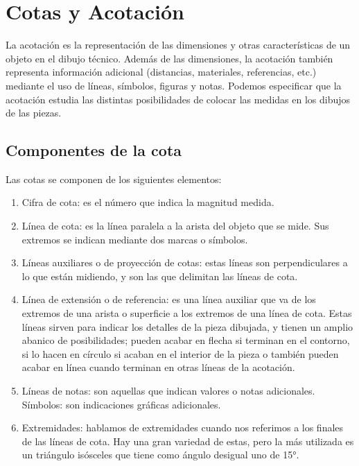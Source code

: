 \documentclass[../main]{subfiles}
\begin{document}
\section{Cotas y Acotación}


La acotación es la representación de las dimensiones y otras características de un objeto en el dibujo técnico. Además de las dimensiones, la acotación también representa información adicional (distancias, materiales, referencias, etc.) mediante el uso de líneas, símbolos, figuras y notas. Podemos especificar que la acotación estudia las distintas posibilidades de colocar las medidas en los dibujos de las piezas.

\subsection{Componentes de la cota}

Las cotas se componen de los siguientes elementos:
\begin{enumerate}
\item Cifra de cota: es el número que indica la magnitud medida.
\item Línea de cota: es la línea paralela a la arista del objeto que se mide. Sus extremos se indican mediante dos marcas o símbolos.
\item Líneas auxiliares o de proyección de cotas: estas líneas son perpendiculares a lo que están midiendo, y son las que delimitan las líneas de cota.
\item Línea de extensión o de referencia: es una línea auxiliar que va de los extremos de una arista o superficie a los extremos de una línea de cota. Estas líneas sirven para indicar los detalles de la pieza dibujada, y tienen un amplio abanico de posibilidades; pueden acabar en flecha si terminan en el contorno, si lo hacen en círculo si acaban en el interior de la pieza o también pueden acabar en línea cuando terminan en otras líneas de la acotación.
\item Líneas de notas: son aquellas que indican valores o notas adicionales.
Símbolos: son indicaciones gráficas adicionales.
\item Extremidades: hablamos de extremidades cuando nos referimos a los finales de las líneas de cota. Hay una gran variedad de estas, pero la más utilizada es un triángulo isósceles que tiene como ángulo desigual uno de 15°.
     
\end{enumerate}
\end{document}
